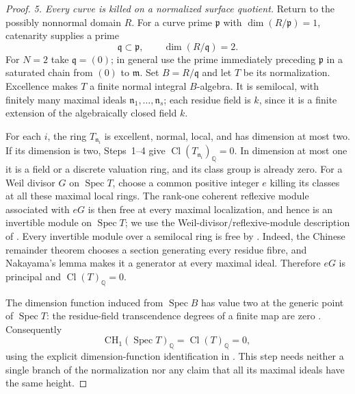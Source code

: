 \begin{proof}
\emph{5. Every curve is killed on a normalized surface quotient.}
Return to the possibly nonnormal domain \(R\). For a curve
prime \(\mathfrak p\) with \(\dim(R/\mathfrak p)=1\),
catenarity supplies a prime
\[
              \mathfrak q\subset\mathfrak p,\qquad
                              \dim(R/\mathfrak q)=2.
\]
For \(N=2\) take \(\mathfrak q=(0)\); in general use the
prime immediately preceding \(\mathfrak p\) in a saturated
chain from \((0)\) to \(\mathfrak m\). Set \(B=R/\mathfrak q\)
and let \(T\) be its normalization. Excellence makes \(T\)
a finite normal integral \(B\)-algebra. It is semilocal, with
finitely many maximal ideals \(\mathfrak n_1,\ldots,\mathfrak n_s\);
each residue field is \(k\), since it is a finite extension
of the algebraically closed field \(k\).

For each \(i\), the ring \(T_{\mathfrak n_i}\) is excellent,
normal, local, and has dimension at most two. If its dimension
is two, Steps~1--4 give
\(\operatorname{Cl}(T_{\mathfrak n_i})_{\mathbb Q}=0\).
In dimension at most one it is a field or a discrete valuation
ring, and its class group is already zero.
For a Weil divisor \(G\) on \(\operatorname{Spec}T\), choose
a common positive integer \(e\) killing its classes at all
these maximal local rings. The rank-one coherent reflexive
module associated with \(eG\) is then free at every maximal
localization, and hence is an invertible module on
\(\operatorname{Spec}T\); we use the Weil-divisor/reflexive-module
description of \citet[Lemma 31.30.2, Tag 0EBM]
{frC3beStacksReflexiveClassGroup}. Every invertible module
over a semilocal ring is free by
\citet[Lemma 10.78.7, Tag 02M9]{frC3beStacksSemilocalPic}.
Indeed, the Chinese remainder theorem chooses a section
generating every residue fibre, and Nakayama's lemma makes it
a generator at every maximal ideal. Therefore \(eG\) is
principal and \(\operatorname{Cl}(T)_{\mathbb Q}=0\).

The dimension function induced from \(\operatorname{Spec}B\)
has value two at the generic point of \(\operatorname{Spec}T\):
the residue-field transcendence degrees of a finite map are
zero \citep[Lemma 29.53.3, Tag 02JW]
{frC3beStacksFiniteDimensionFunction}. Consequently
\begin{equation}\label{eq:C3be-semilocal-surface}
 \mathrm{CH}_1(\operatorname{Spec}T)_{\mathbb Q}
       =\operatorname{Cl}(T)_{\mathbb Q}=0,
\end{equation}
using the explicit dimension-function identification in
\citet[Section 42.24, immediately after Definition 42.24.1,
Tag 02SI]{frC3beStacksClassChow}.
This step needs neither a single branch of the normalization
nor any claim that all its maximal ideals have the same height.


\end{proof}
